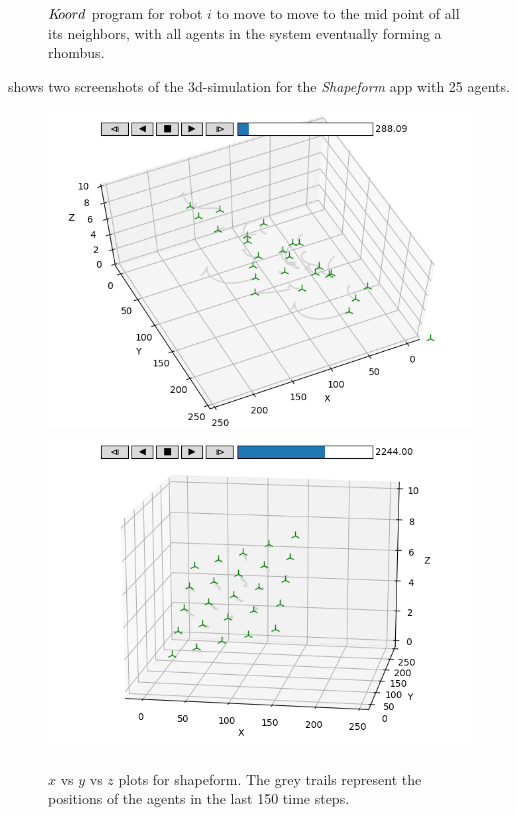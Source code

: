 \begin{figure}[ht!]
    \noindent
    \begin{mdframed}
    \begin{center}
        \scriptsize
        {}
        {}
    \end{center}
    \end{mdframed}
    \caption{$K\kern-2pt oord$ program for robot $i$ to move to move to the mid point of all its neighbors, with all agents in the system eventually forming a rhombus.}
    \label{fig:squareform}
\end{figure}

 shows two screenshots of the 3d-simulation for the \emph{Shapeform} app with 25 agents. 


\begin{figure}[h!]
\begin{minipage}{0.5\textwidth}
\includegraphics[width=.5\textwidth]{figs/formation1.png}\hfill
\includegraphics[width=.5\textwidth]{figs/formation4.png}\hfill%
\end{minipage}%
\caption{$x$ vs $y$ vs $z$ plots for shapeform. The grey trails represent the positions of the agents in the last 150 time steps.}
\label{fig:shapeplots}

\end{figure}

